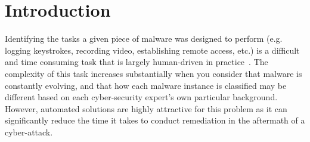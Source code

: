 \documentclass[conference]{IEEEtran}
\begin{document}
\section{Introduction}
Identifying the tasks a given piece of malware was designed to perform (e.g. logging keystrokes, recording video, establishing remote access, etc.) is a difficult and time consuming task that is largely human-driven in practice~\cite{sikorski}.  The complexity of this task increases substantially when you consider that malware is constantly evolving, and that how each malware instance is classified may be different based on each cyber-security expert's own particular background.  However, automated solutions are highly attractive for this problem as it can significantly reduce the time it takes to conduct remediation in the aftermath of a cyber-attack.
\end{document}
